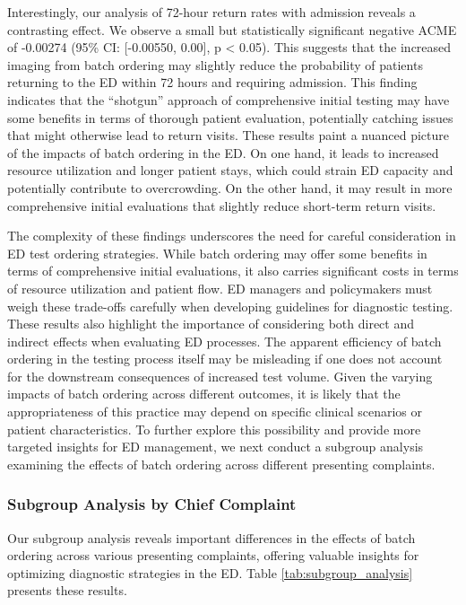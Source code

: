 \documentclass{article}
\begin{document}
Interestingly, our analysis of 72-hour return rates with admission
reveals a contrasting effect. We observe a small but statistically
significant negative ACME of -0.00274 (95\% CI: {[}-0.00550, 0.00{]}, p
\textless{} 0.05). This suggests that the increased imaging from batch
ordering may slightly reduce the probability of patients returning to
the ED within 72 hours and requiring admission. This finding indicates
that the ``shotgun'' approach of comprehensive initial testing may have
some benefits in terms of thorough patient evaluation, potentially
catching issues that might otherwise lead to return visits. These
results paint a nuanced picture of the impacts of batch ordering in the
ED. On one hand, it leads to increased resource utilization and longer
patient stays, which could strain ED capacity and potentially contribute
to overcrowding. On the other hand, it may result in more comprehensive
initial evaluations that slightly reduce short-term return visits.

The complexity of these findings underscores the need for careful
consideration in ED test ordering strategies. While batch ordering may
offer some benefits in terms of comprehensive initial evaluations, it
also carries significant costs in terms of resource utilization and
patient flow. ED managers and policymakers must weigh these trade-offs
carefully when developing guidelines for diagnostic testing. These
results also highlight the importance of considering both direct and
indirect effects when evaluating ED processes. The apparent efficiency
of batch ordering in the testing process itself may be misleading if one
does not account for the downstream consequences of increased test
volume. Given the varying impacts of batch ordering across different
outcomes, it is likely that the appropriateness of this practice may
depend on specific clinical scenarios or patient characteristics. To
further explore this possibility and provide more targeted insights for
ED management, we next conduct a subgroup analysis examining the effects
of batch ordering across different presenting complaints.

\hypertarget{subgroup-analysis-by-chief-complaint}{%
\subsubsection{Subgroup Analysis by Chief
Complaint}\label{subgroup-analysis-by-chief-complaint}}

Our subgroup analysis reveals important differences in the effects of
batch ordering across various presenting complaints, offering valuable
insights for optimizing diagnostic strategies in the ED. Table
\ref{tab:subgroup_analysis} presents these results.
\end{document}
